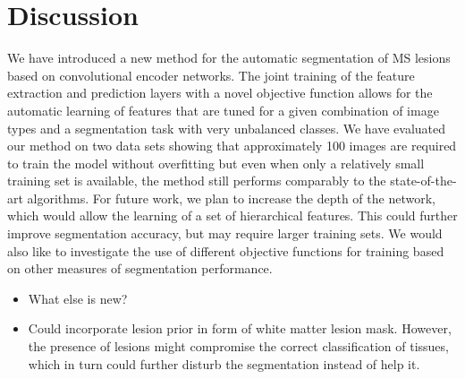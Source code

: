 \section{Discussion}

We have introduced a new method for the automatic segmentation of MS lesions
based on convolutional encoder networks. The joint training of the feature
extraction and prediction layers with a novel objective function allows for the
automatic learning of features that are tuned for a given combination of image
types and a segmentation task with very unbalanced classes.
We have evaluated our method on two data sets showing that approximately 100
images are required to train the model without overfitting but even when only a
relatively small training set is available, the method still performs comparably
to the state-of-the-art algorithms. For future work, we plan to increase the
depth of the network, which would allow the learning of a set of hierarchical
features. This could further improve segmentation accuracy, but may require
larger training sets. We would also like to investigate the use of different
objective functions for training based on other measures of segmentation
performance.

\begin{itemize}
\item What else is new? 
\item Could incorporate lesion prior in form of white matter lesion mask.
However, the presence of lesions might compromise the correct classification of
tissues, which in turn could further disturb the segmentation instead of help
it.
\end{itemize}

